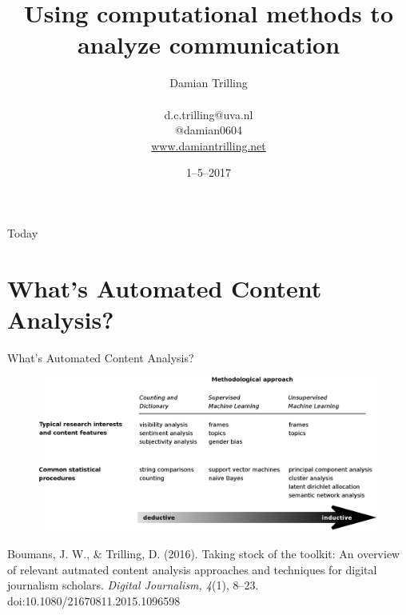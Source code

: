 \documentclass{beamer}
\begin{document}
\title{Using computational methods to analyze communication}
\author[Damian Trilling]{Damian Trilling \\ ~ \\ \footnotesize{d.c.trilling@uva.nl \\@damian0604} \\ \url{www.damiantrilling.net}}
\date{1--5--2017}



\begin{frame}{}
\titlepage
\end{frame}

\begin{frame}{Today}
\tableofcontents
\end{frame}



\section[What's ACA?]{What's Automated Content Analysis?}
\begin{frame}[plain]
	What's Automated Content Analysis?
\end{frame}


\begin{frame}[plain]
\begin{figure}
\centering
\includegraphics[width=1.0\linewidth]{boumanstrilling2016}
\label{fig:boumanstrilling2016}
\end{figure}
\tiny{Boumans, J. W., \& Trilling, D. (2016). Taking stock of the toolkit: An overview of relevant autmated content analysis approaches and techniques for digital journalism scholars. \emph{Digital Journalism, 4}(1), 8–23. doi:10.1080/21670811.2015.1096598}
\end{frame}
\end{document}
